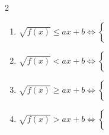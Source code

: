 \documentclass[12pt,a4paper]{article}
\begin{document}
\begin{multicols}{2}
\begin{enumerate}
\item $
\sqrt{ f(x)} \leq ax+b \Leftrightarrow \begin{cases}
\\
 \\
\\
\\
\end{cases}
$

\item $
\sqrt{ f(x)} < ax+b \Leftrightarrow \begin{cases}
\\
 \\
\\
\\
\end{cases}
$

\item $
\sqrt{ f(x)} \geq ax+b \Leftrightarrow \begin{cases}
\\
 \\
\\
\\
\end{cases}
$

\item $
\sqrt{ f(x)} > ax+b \Leftrightarrow \begin{cases}
\\
 \\
\\
\\
\end{cases}
$
\end{enumerate}
\end{multicols}
\end{document}
